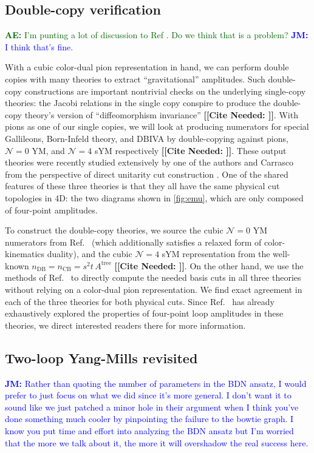 \documentclass[11pt,letter]{article}
\newcommand{\ace}[1]{\textcolor{darkgreen}{\textbf{AE:}{ #1}}}
\newcommand{\jm}[1]{\textcolor{blue}{\textbf{JM: }{#1}}}
\newcommand{\citepls}[1]{{\bf\color{red}[[Cite Needed: #1]]}}
\newcommand{\atree}{\ensuremath{A^{\text{tree}}}}
\begin{document}
\subsection{Double-copy verification}\label{doubleCopyVerify}
\ace{I'm punting a lot of discussion to Ref \cite{Carrasco:2023qgz}.
  Do we think that is a problem?} \jm{I think that's fine.}

With a cubic color-dual pion representation in hand, we can perform
double copies with many theories to extract ``gravitational''
amplitudes.  Such double-copy constructions are important nontrivial
checks on the underlying single-copy theories: the Jacobi relations in
the single copy conspire to produce the double-copy theory's version
of ``diffeomorphism invariance'' \citepls{}.  With pions as one of our single
copies, we will look at producing numerators for special Gallileons,
Born-Infeld theory, and DBIVA by double-copying against pions,
$\mathcal{N}=0$ YM, and $\mathcal{N}=4$ sYM respectively \citepls{}.
These output theories were recently studied extensively by one of the
authors and Carrasco from the perspective of direct unitarity cut
construction \cite{Carrasco:2023qgz}.  One of the shared features of
these three theories is that they all have the same physical cut
topologies in 4D: the two diagrams shown in \cref{fig:emu}, which are
only composed of four-point amplitudes.

To construct the double-copy theories, we source the cubic
$\mathcal{N}=0$ YM numerators from Ref.~\cite{Bern:2015ooa} (which
additionally satisfies a relaxed form of color-kinematics duality),
and the cubic $\mathcal{N}=4$ sYM representation from the well-known
$n_{\text{DB}} = n_{\text{CB}} = s^2t\, \atree$ \citepls{}.
On the other hand, we use the methods of Ref.~\cite{Carrasco:2023qgz}
to directly compute the needed basis cuts in all three theories without
relying on a color-dual pion representation.  We find exact agreement
in each of the three theories for both physical cuts.  Since
Ref.~\cite{Carrasco:2023qgz} has already exhaustively explored the
properties of four-point loop amplitudes in these theories, we direct
interested readers there for more information.


\subsection{Two-loop Yang-Mills revisited}\label{2loopYM}

\jm{Rather than quoting the number of parameters in the BDN ansatz, I would prefer to just focus on what we did since it's more general.  I don't want it to sound like we just patched a minor hole in their argument when I think you've done something much cooler by pinpointing the failure to the bowtie graph. I know you put time and effort into analyzing the BDN ansatz but I'm worried that the more we talk about it, the more it will overshadow the real success here.}
\end{document}

